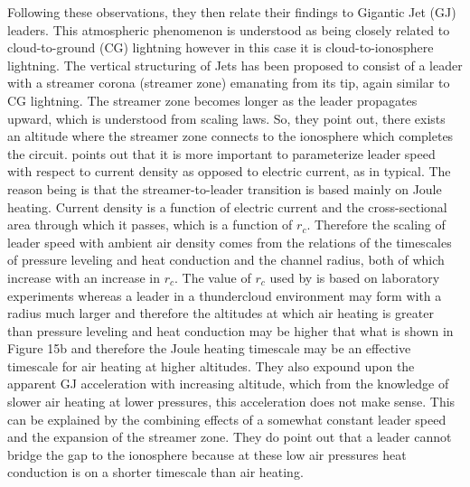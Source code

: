 \documentclass[]{article}
\begin{document}
	Following these observations, they then relate their findings to Gigantic Jet (GJ) leaders. This atmospheric phenomenon is understood as being closely related to cloud-to-ground (CG) lightning however in this case it is cloud-to-ionosphere lightning. The vertical structuring of Jets has been proposed to consist of a leader with a streamer corona (streamer zone) emanating from its tip, again similar to CG lightning. The streamer zone becomes longer as the leader propagates upward, which is understood from scaling laws. So, they point out, there exists an altitude where the streamer zone connects to the ionosphere which completes the circuit. \citet{daSilva:2013a} points out that it is more important to parameterize leader speed with respect to current density as opposed to electric current, as in typical. The reason being is that the streamer-to-leader transition is based mainly on Joule heating. Current density is a function of electric current and the cross-sectional area through which it passes, which is a function of $r_c$. Therefore the scaling of leader speed with ambient air density comes from the relations of the timescales of pressure leveling and heat conduction and the channel radius, both of which increase with an increase in $r_c$. The value of $r_c$ used by \citet{daSilva:2013a} is based on laboratory experiments whereas a leader  in a thundercloud environment may form with a radius much larger and therefore the altitudes at which air heating is greater than pressure leveling and heat conduction may be higher that what is shown in Figure 15b and therefore the Joule heating timescale may be an effective timescale for air heating at higher altitudes. They also expound upon the apparent GJ acceleration with increasing altitude, which from the knowledge of slower air heating at lower pressures, this acceleration does not make sense. This can be explained by the combining effects of a somewhat constant leader speed and the expansion of the streamer zone. They do point out that a leader cannot bridge the gap to the ionosphere because at these low air pressures heat conduction is on a shorter timescale than air heating. 
	
	
	
\end{document}
